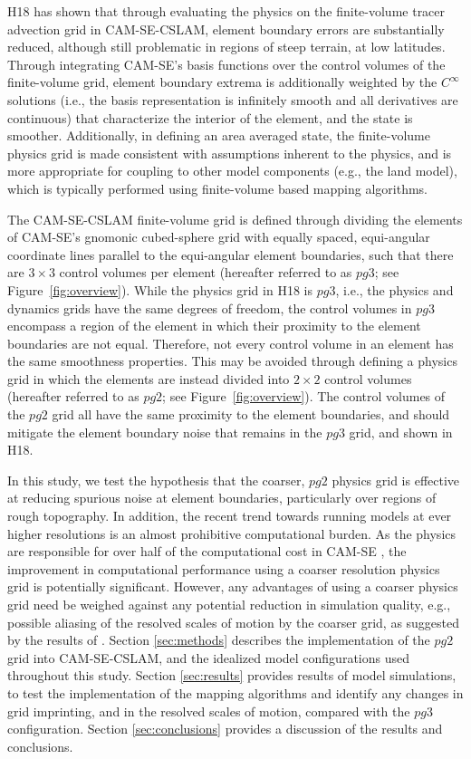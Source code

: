 \documentclass[draft,linenumbers]{agujournal}
\begin{document}
H18 has shown that through evaluating the physics on the finite-volume tracer advection grid in CAM-SE-CSLAM, element boundary errors are substantially reduced, although still problematic in regions of steep terrain, at low latitudes. Through integrating CAM-SE's basis functions over the control volumes of the finite-volume grid, element boundary extrema is additionally weighted by the $C^{\infty}$ solutions (i.e., the basis representation is infinitely smooth and all derivatives are continuous) that characterize the interior of the element, and the state is smoother. Additionally, in defining an area averaged state, the finite-volume physics grid is made consistent with assumptions inherent to the physics, and is more appropriate for coupling to other model components (e.g., the land model), which is typically performed using finite-volume based mapping algorithms.

The CAM-SE-CSLAM finite-volume grid is defined through dividing the elements of CAM-SE's gnomonic cubed-sphere grid with equally spaced, equi-angular coordinate lines parallel to the equi-angular element boundaries, such that there are $3\times 3$ control volumes per element (hereafter referred to as $pg3$; see Figure~\ref{fig:overview}). While the physics grid in H18 is $pg3$, i.e., the physics and dynamics grids have the same degrees of freedom, the control volumes in $pg3$ encompass a region of the element in which their proximity to the element boundaries are not equal. Therefore, not every control volume in an element has the same smoothness properties. This may be avoided through defining a physics grid in which the elements are instead divided into $2\times 2$ control volumes (hereafter referred to as $pg2$; see Figure~\ref{fig:overview}). The control volumes of the $pg2$ grid all have the same proximity to the element boundaries, and should mitigate the element boundary noise that remains in the $pg3$ grid, and shown in H18.

In this study, we test the hypothesis that the coarser, $pg2$ physics grid is effective at reducing spurious noise at element boundaries, particularly over regions of rough topography. In addition, the recent trend towards running models at ever higher resolutions is an almost prohibitive computational burden. As the physics are responsible for over half of the computational cost in CAM-SE \citep{LetAl2018JAMES}, the improvement in computational performance using a coarser resolution physics grid is potentially significant. However, any advantages of using a coarser physics grid need be weighed against any potential reduction in simulation quality, e.g., possible aliasing of the resolved scales of motion by the coarser grid, as suggested by the results of \cite{W1999T}. Section \ref{sec:methods} describes the implementation of the $pg2$ grid into CAM-SE-CSLAM, and the idealized model configurations used throughout this study. Section \ref{sec:results} provides results of model simulations, to test the implementation of the mapping algorithms and identify any changes in grid imprinting, and in the resolved scales of motion, compared with the $pg3$ configuration. Section \ref{sec:conclusions} provides a discussion of the results and conclusions.
\end{document}

